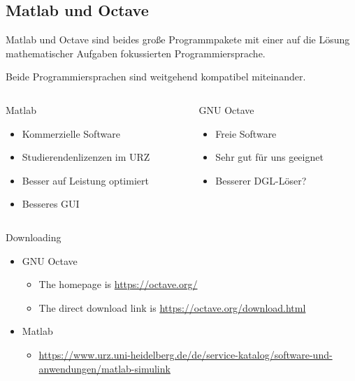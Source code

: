 \subsection{Matlab und Octave}
\frame{\subtoc}

\begin{frame}
  Matlab und Octave sind beides große Programmpakete mit einer auf die
  Lösung mathematischer Aufgaben fokussierten Programmiersprache.

  Beide Programmiersprachen sind weitgehend kompatibel miteinander.

  \begin{columns}
    \begin{column}[t]{.49\textwidth}
      \begin{block}{Matlab}
        \begin{itemize}
        \item Kommerzielle Software
        \item Studierendenlizenzen im URZ
        \item Besser auf Leistung optimiert
        \item Besseres GUI
        \end{itemize}
      \end{block}
    \end{column}
    \begin{column}[t]{.49\textwidth}
      \begin{block}{GNU Octave}
        \begin{itemize}
        \item Freie Software
        \item Sehr gut für uns geeignet
        \item Besserer DGL-Löser?
        \end{itemize}
      \end{block}
    \end{column}
  \end{columns}
\end{frame}

\begin{frame}{Downloading}

  \begin{itemize}
  \item GNU Octave
    \begin{itemize}
    \item The homepage is \url{https://octave.org/}
    \item The direct download link is \url{https://octave.org/download.html}
    \end{itemize}
  \item Matlab
    \begin{itemize}
    \item
      \url{https://www.urz.uni-heidelberg.de/de/service-katalog/software-und-anwendungen/matlab-simulink}
    \end{itemize}
  \end{itemize}
\end{frame}

